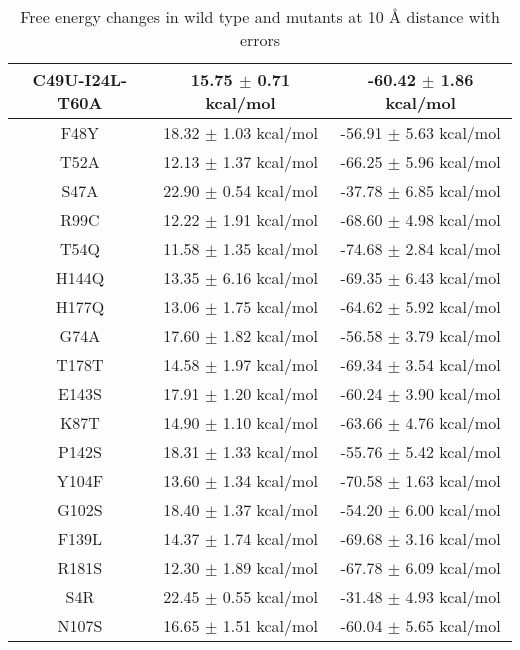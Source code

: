 \documentclass{article}
\begin{document}
\begin{table}[ht]
    \centering
    \begin{tabular}{|c|c|c|}
    \hline
    C49U-I24L-T60A & 15.75 $\pm$ 0.71 kcal/mol & -60.42 $\pm$ 1.86 kcal/mol \\
    \hline
    F48Y & 18.32 $\pm$ 1.03 kcal/mol & -56.91 $\pm$ 5.63 kcal/mol \\
    \hline
    T52A & 12.13 $\pm$ 1.37 kcal/mol & -66.25 $\pm$ 5.96 kcal/mol \\
    \hline
    S47A & 22.90 $\pm$ 0.54 kcal/mol & -37.78 $\pm$ 6.85 kcal/mol \\
    \hline
    R99C & 12.22 $\pm$ 1.91 kcal/mol & -68.60 $\pm$ 4.98 kcal/mol \\
    \hline
    T54Q & 11.58 $\pm$ 1.35 kcal/mol & -74.68 $\pm$ 2.84 kcal/mol \\
    \hline
    H144Q & 13.35 $\pm$ 6.16 kcal/mol & -69.35 $\pm$ 6.43 kcal/mol \\
    \hline
    H177Q & 13.06 $\pm$ 1.75 kcal/mol & -64.62 $\pm$ 5.92 kcal/mol \\
    \hline
    G74A & 17.60 $\pm$ 1.82 kcal/mol & -56.58 $\pm$ 3.79 kcal/mol \\
    \hline
    T178T & 14.58 $\pm$ 1.97 kcal/mol & -69.34 $\pm$ 3.54 kcal/mol \\
    \hline
    E143S & 17.91 $\pm$ 1.20 kcal/mol & -60.24 $\pm$ 3.90 kcal/mol \\
    \hline
    K87T & 14.90 $\pm$ 1.10 kcal/mol & -63.66 $\pm$ 4.76 kcal/mol \\
    \hline
    P142S & 18.31 $\pm$ 1.33 kcal/mol & -55.76 $\pm$ 5.42 kcal/mol \\
    \hline
    Y104F & 13.60 $\pm$ 1.34 kcal/mol & -70.58 $\pm$ 1.63 kcal/mol \\
    \hline
    G102S & 18.40 $\pm$ 1.37 kcal/mol & -54.20 $\pm$ 6.00 kcal/mol \\
    \hline
    F139L & 14.37 $\pm$ 1.74 kcal/mol & -69.68 $\pm$ 3.16 kcal/mol \\
    \hline
    R181S & 12.30 $\pm$ 1.89 kcal/mol & -67.78 $\pm$ 6.09 kcal/mol \\
    \hline
    S4R & 22.45 $\pm$ 0.55 kcal/mol & -31.48 $\pm$ 4.93 kcal/mol \\
    \hline
    N107S & 16.65 $\pm$ 1.51 kcal/mol & -60.04 $\pm$ 5.65 kcal/mol \\
    \hline
    \end{tabular}
    \caption{Free energy changes in wild type and mutants at 10 Å distance with errors}
\end{table}
\end{document}
